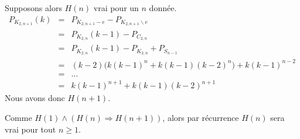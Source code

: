 \begin{itemize}
Supposons alors $H(n)$ vrai pour un $n$ donnée. 
\begin{eqnarray*}
P_{K_{2,n+1}}(k)			& = & P_{K_{2,n+1}-e} - P_{K_{2,n+1} \backslash{e}}				\\
							& = & P_{K_{2,n}}(k-1) - P_{C_{2,n}}							\\
							& = & P_{K_{2,n}}(k-1) - P_{K_{2,n}} + P_{S_{n-1}}					\\
							& = & (k-2)\big(k(k-1)^n + k(k-1)(k-2)^n\big) + k(k-1)^{n-2}	\\
							& = & \ldots													\\
							& = & k(k-1)^{n+1} + k(k-1)(k-2)^{n+1}
\end{eqnarray*}
Nous avons donc $H(n+1)$.
\end{itemize}
Comme $H(1) \wedge (H(n) \Rightarrow H(n+1))$, alors par récurrence $H(n)$ sera vrai pour tout $n \geq 1$.
